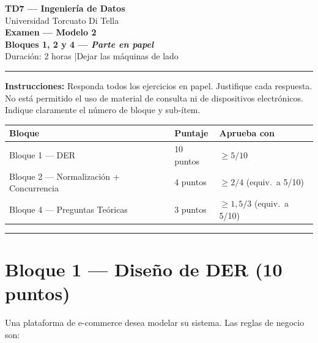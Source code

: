 \documentclass[11pt,a4paper]{article}
\begin{document}
\begin{center}
  {\LARGE\bfseries TD7 — Ingeniería de Datos}\\[6pt]
  {\large Universidad Torcuato Di Tella}\\[4pt]
  {\Large\bfseries Examen — Modelo 2}\\[2pt]
  {\large\bfseries Bloques 1, 2 y 4 \textnormal{---} \textit{Parte en papel}}\\[4pt]
  {\normalsize Duración: 2 horas \quad|\quad Dejar las máquinas de lado}
\end{center}
\noindent\rule{\linewidth}{0.8pt}
\vspace{2pt}

\noindent\textbf{Instrucciones:} Responda todos los ejercicios en papel. Justifique cada respuesta. No está permitido el uso de material de consulta ni de dispositivos electrónicos. Indique claramente el número de bloque y sub-ítem.

\vspace{4pt}

\begin{center}\small
\begin{tabular}{lll}
\toprule
\textbf{Bloque} & \textbf{Puntaje} & \textbf{Aprueba con} \\
\midrule
Bloque 1 — DER                    & 10 puntos & $\geq 5 / 10$ \\
Bloque 2 — Normalización + Concurrencia & 4 puntos  & $\geq 2 / 4$ \;(equiv.\ a 5/10) \\
Bloque 4 — Preguntas Teóricas     & 3 puntos  & $\geq 1{,}5 / 3$ \;(equiv.\ a 5/10) \\
\bottomrule
\end{tabular}
\end{center}

\vspace{4pt}
\noindent\rule{\linewidth}{0.4pt}

\section*{Bloque 1 — Diseño de DER \hfill\normalfont(10 puntos)}

Una plataforma de e-commerce desea modelar su sistema. Las reglas de negocio son:
\end{document}
